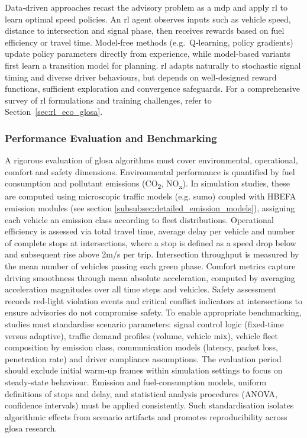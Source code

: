 \mynewline
Data‐driven approaches recast the advisory problem as a \ac{mdp} and apply \ac{rl} to learn optimal speed policies.  
An \ac{rl} agent observes inputs such as vehicle speed, distance to intersection and signal phase, then receives rewards based on fuel efficiency or travel time.  
Model‐free methods (e.g.\ Q‐learning, policy gradients) update policy parameters directly from experience, while model‐based variants first learn a transition model for planning.  
\ac{rl} adapts naturally to stochastic signal timing and diverse driver behaviours, but depends on well‐designed reward functions, sufficient exploration and convergence safeguards.  
For a comprehensive survey of \ac{rl} formulations and training challenges, refer to Section~\ref{sec:rl_eco_glosa}.


\subsubsection{Performance Evaluation and Benchmarking}
\label{subsubsec:performance_evaluation}

A rigorous evaluation of \ac{glosa} algorithms must cover environmental, operational, comfort and safety dimensions. Environmental performance is quantified by fuel consumption and pollutant emissions (CO\textsubscript{2}, NO\textsubscript{x}). \cite{Kloeppel2019,Lenz2024} In simulation studies, these are computed using microscopic traffic models (e.g. \ac{sumo}) coupled with HBEFA emission modules (see section \ref{subsubsec:detailed_emission_models}), assigning each vehicle an emission class according to fleet distributions. Operational efficiency is assessed via total travel time, average delay per vehicle and number of complete stops at intersections, where a stop is defined as a speed drop below and subsequent rise above 2m/s per trip. Intersection throughput is measured by the mean number of vehicles passing each green phase. Comfort metrics capture driving smoothness through mean absolute acceleration, computed by averaging acceleration magnitudes over all time steps and vehicles. Safety assessment records red‐light violation events and critical conflict indicators at intersections to ensure advisories do not compromise safety. \cite{Kloeppel2019,Lenz2024}
\mynewline
To enable appropriate benchmarking, studies must standardise scenario parameters: signal control logic (fixed‐time versus adaptive)\cite{Kloeppel2020}, traffic demand profiles (volume, vehicle mix), vehicle fleet composition by emission class, communication models (latency, packet loss, penetration rate) and driver compliance assumptions. The evaluation period should exclude initial warm‐up frames within simulation settings to focus on steady‐state behaviour. \cite{Lenz2024} Emission and fuel‐consumption models, uniform definitions of stops and delay, and statistical analysis procedures (ANOVA, confidence intervals) must be applied consistently. \cite{Kloeppel2019} Such standardisation isolates algorithmic effects from scenario artifacts and promotes reproducibility across \ac{glosa} research. \cite{Kloeppel2020}



